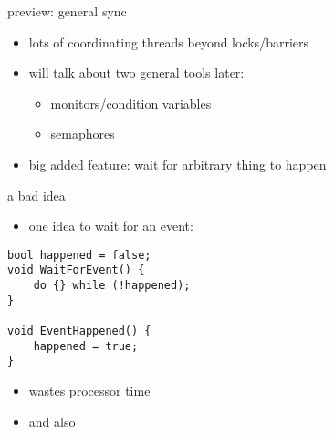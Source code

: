 \begin{frame}{preview: general sync}
    \begin{itemize}
    \item lots of coordinating threads beyond locks/barriers
    \item will talk about two general tools later:
        \begin{itemize}
        \item monitors/condition variables
        \item semaphores
        \end{itemize}
    \item big added feature: wait for arbitrary thing to happen
    \end{itemize}
\end{frame}

\begin{frame}[fragile]{a bad idea}
\begin{itemize}
\item one  idea to wait for an event:
\end{itemize}
\begin{lstlisting}
bool happened = false;
void WaitForEvent() {
    do {} while (!happened);
}

void EventHappened() {
    happened = true;
}
\end{lstlisting}
\begin{itemize}
\item wastes processor time
\item and also 
\end{itemize}
\end{frame}
